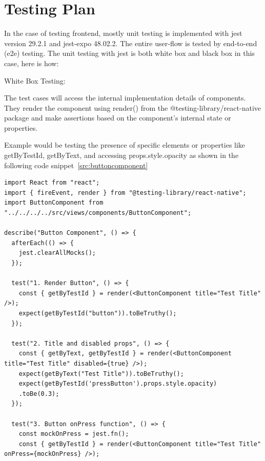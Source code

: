 \section{Testing Plan}\label{sec:testing-plan}
In the case of testing frontend, mostly unit testing is implemented with jest version 29.2.1 and jest-expo 48.02.2. The entire user-flow is tested by end-to-end (e2e) testing. The unit testing with jest is both white box and black box in this case, here is how:
\begin{compactenum}
    \item White Box Testing:
    \begin{compactitem}
        \item The test cases will access the internal implementation details of components. They render the component using render() from the @testing-library/react-native package and make assertions based on the component's internal state or properties.
        \item Example would be testing the presence of specific elements or properties like getByTestId, getByText, and accessing props.style.opacity as shown in the following code snippet~\ref{src:buttoncomponent} \newline

\begin{listing}[H]
\begin{verbatim} 
import React from "react";
import { fireEvent, render } from "@testing-library/react-native";
import ButtonComponent from "../../../../src/views/components/ButtonComponent";

describe("Button Component", () => {
  afterEach(() => {
    jest.clearAllMocks();
  });

  test("1. Render Button", () => {
    const { getByTestId } = render(<ButtonComponent title="Test Title" />);
    expect(getByTestId("button")).toBeTruthy();
  });

  test("2. Title and disabled props", () => {
    const { getByText, getByTestId } = render(<ButtonComponent title="Test Title" disabled={true} />);
    expect(getByText("Test Title")).toBeTruthy();
    expect(getByTestId('pressButton').props.style.opacity)
    .toBe(0.3);
  });

  test("3. Button onPress function", () => {
    const mockOnPress = jest.fn();
    const { getByTestId } = render(<ButtonComponent title="Test Title" onPress={mockOnPress} />);
    

\end{verbatim}
\end{listing}
\end{compactitem}
\end{compactenum}
